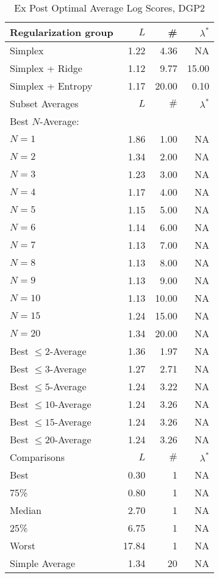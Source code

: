 \begin{table}[htp] 
\begin{center} 
\caption{Ex Post Optimal Average Log Scores, DGP2} 
\begin{tabular}{lrrr} 
\toprule 
\toprule 
Regularization group & $ L $ & \# & $\lambda^*$ \\ 
\midrule 
Simplex & 1.22 & 4.36 & NA \\ 
Simplex + Ridge & 1.12 & 9.77 & 15.00 \\ 
Simplex + Entropy & 1.17 & 20.00 & 0.10 \\ 
\midrule 
\midrule 
Subset Averages & $ L $ & $\#$ & $\lambda^*$ \\ 
\midrule 
Best $N$-Average: &  &  & \\ 
\quad $N = 1$ & 1.86 & 1.00 & NA \\ 
\quad $N = 2$ & 1.34 & 2.00 & NA \\ 
\quad $N = 3$ & 1.23 & 3.00 & NA \\ 
\quad $N = 4$ & 1.17 & 4.00 & NA \\ 
\quad $N = 5$ & 1.15 & 5.00 & NA \\ 
\quad $N = 6$ & 1.14 & 6.00 & NA \\ 
\quad $N = 7$ & 1.13 & 7.00 & NA \\ 
\quad $N = 8$ & 1.13 & 8.00 & NA \\ 
\quad $N = 9$ & 1.13 & 9.00 & NA \\ 
\quad $N = 10$ & 1.13 & 10.00 & NA \\ 
\quad $N = 15$ & 1.24 & 15.00 & NA \\ 
\quad $N = 20$ & 1.34 & 20.00 & NA \\ 
Best $\leq 2$-Average & 1.36 & 1.97 & NA \\ 
Best $\leq 3$-Average & 1.27 & 2.71 & NA \\ 
Best $\leq 5$-Average & 1.24 & 3.22 & NA \\ 
Best $\leq 10$-Average & 1.24 & 3.26 & NA \\ 
Best $\leq 15$-Average & 1.24 & 3.26 & NA \\ 
Best $\leq 20$-Average & 1.24 & 3.26 & NA \\ 
\midrule 
\midrule 
Comparisons & $ L $ & $\#$ & $\lambda^*$ \\ 
\midrule 
Best & 0.30 & 1 & NA \\ 
75\% & 0.80 & 1 & NA \\ 
Median & 2.70 & 1 & NA \\ 
25\% & 6.75 & 1 & NA \\ 
Worst & 17.84 & 1 & NA \\ 
\midrule 
Simple Average & 1.34 & 20 & NA \\ 
\bottomrule 
\bottomrule 
\end{tabular} 
\end{center} 
\end{table} 
